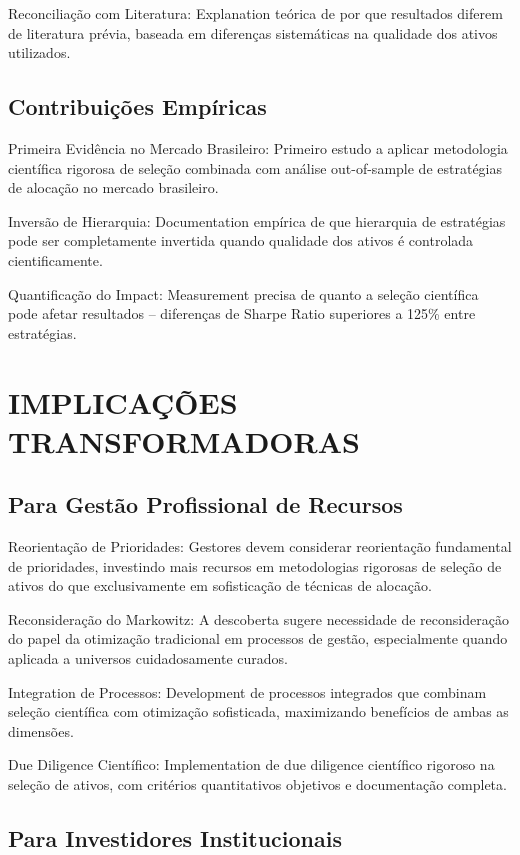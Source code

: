 Reconciliação com Literatura: Explanation teórica de por que resultados diferem de literatura prévia, baseada em diferenças sistemáticas na qualidade dos ativos utilizados.

\subsection{Contribuições Empíricas}

Primeira Evidência no Mercado Brasileiro: Primeiro estudo a aplicar metodologia científica rigorosa de seleção combinada com análise out-of-sample de estratégias de alocação no mercado brasileiro.

Inversão de Hierarquia: Documentation empírica de que hierarquia de estratégias pode ser completamente invertida quando qualidade dos ativos é controlada cientificamente.

Quantificação do Impact: Measurement precisa de quanto a seleção científica pode afetar resultados – diferenças de Sharpe Ratio superiores a 125\% entre estratégias.

\section{IMPLICAÇÕES TRANSFORMADORAS}

\subsection{Para Gestão Profissional de Recursos}

Reorientação de Prioridades: Gestores devem considerar reorientação fundamental de prioridades, investindo mais recursos em metodologias rigorosas de seleção de ativos do que exclusivamente em sofisticação de técnicas de alocação.

Reconsideração do Markowitz: A descoberta sugere necessidade de reconsideração do papel da otimização tradicional em processos de gestão, especialmente quando aplicada a universos cuidadosamente curados.

Integration de Processos: Development de processos integrados que combinam seleção científica com otimização sofisticada, maximizando benefícios de ambas as dimensões.

Due Diligence Científico: Implementation de due diligence científico rigoroso na seleção de ativos, com critérios quantitativos objetivos e documentação completa.

\subsection{Para Investidores Institucionais}


